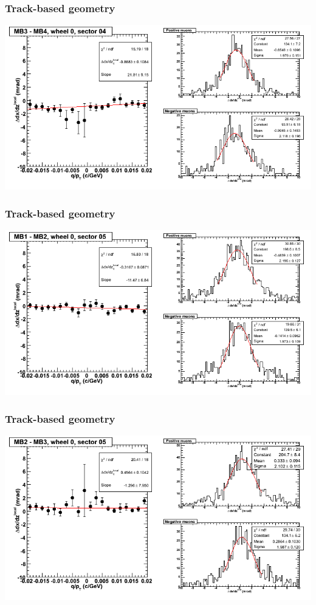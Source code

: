 \documentclass[compress]{beamer}
\begin{document}
\begin{frame}
\frametitle{Track-based geometry}
\includegraphics[width=\linewidth]{NOV4_segdiffs/dt13_slope_C_04_34.png}
\end{frame}

\begin{frame}
\frametitle{Track-based geometry}
\includegraphics[width=\linewidth]{NOV4_segdiffs/dt13_slope_C_05_12.png}
\end{frame}

\begin{frame}
\frametitle{Track-based geometry}
\includegraphics[width=\linewidth]{NOV4_segdiffs/dt13_slope_C_05_23.png}
\end{frame}
\end{document}
